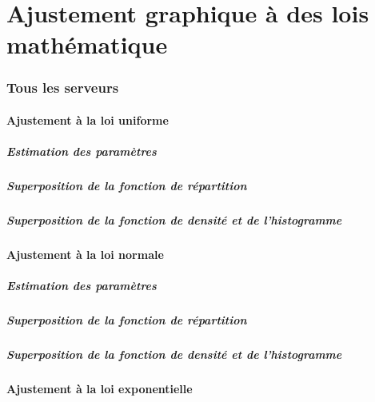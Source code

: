 \documentclass{article}
\begin{document}
\part{Ajustement graphique à des lois mathématique}

\section{Tous les serveurs}

\subsection{Ajustement à la loi uniforme}

\subsubsection{Estimation des paramètres}
\subsubsection{Superposition de la fonction de répartition}
\subsubsection{Superposition de la fonction de densité et de l'histogramme}

\subsection{Ajustement à la loi normale}

\subsubsection{Estimation des paramètres}
\subsubsection{Superposition de la fonction de répartition}
\subsubsection{Superposition de la fonction de densité et de l'histogramme}

\subsection {Ajustement à la loi exponentielle}
\end{document}
